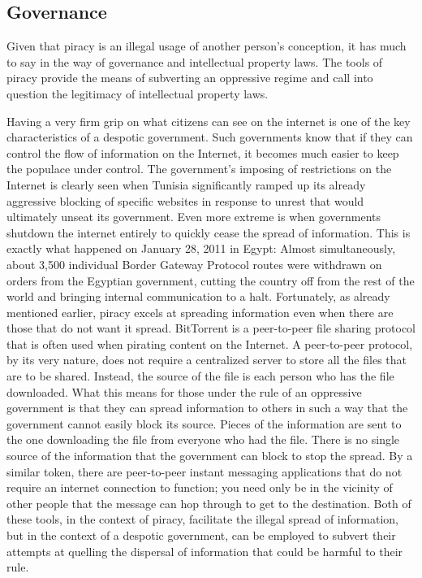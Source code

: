 \documentclass[onecolumn, 12pt]{article}
\begin{document}
\subsection{Governance}
Given that piracy is an illegal usage of another person's conception, it has much to say
in the way of governance and intellectual property laws. The tools of piracy provide the
means of subverting an oppressive regime and call into question the legitimacy of
intellectual property laws.

Having a very firm grip on what citizens can see on the internet is one of the key
characteristics of a despotic government. Such governments know that if they can control
the flow of information on the Internet, it becomes much easier to keep the populace under
control. The government's imposing of restrictions on the Internet is clearly seen when
 {Tunisia significantly ramped up its already aggressive
blocking of specific websites in response to unrest that would ultimately unseat its
government.} Even more extreme is when governments shutdown the internet entirely to
quickly cease the spread of information. This is exactly what happened on January 28, 2011
in Egypt:  {Almost simultaneously, about 3,500 individual
Border Gateway Protocol routes \textelp{} were withdrawn on orders from the Egyptian
government, cutting the country off from the rest of the world and bringing internal
communication to a halt.} Fortunately, as already mentioned earlier, piracy excels at
spreading information even when there are those that do not want it spread. BitTorrent is
a peer-to-peer file sharing protocol that is often used when pirating content on the
Internet. A peer-to-peer protocol, by its very nature, does not require a centralized
server to store all the files that are to be shared. Instead, the source of the file is
each person who has the file downloaded. What this means for those under the rule of an
oppressive government is that they can spread information to others in such a way that the
government cannot easily block its source. Pieces of the information are sent to the one
downloading the file from everyone who had the file. There is no single source of the
information that the government can block to stop the spread. By a similar token, there
are peer-to-peer instant messaging applications that do not require an internet connection
to function; you need only be in the vicinity of other people that the message can hop
through to get to the destination. Both of these tools, in the context of piracy, facilitate
the illegal spread of information, but in the context of a despotic government, can be
employed to subvert their attempts at quelling the dispersal of information that could be
harmful to their rule.
\end{document}
